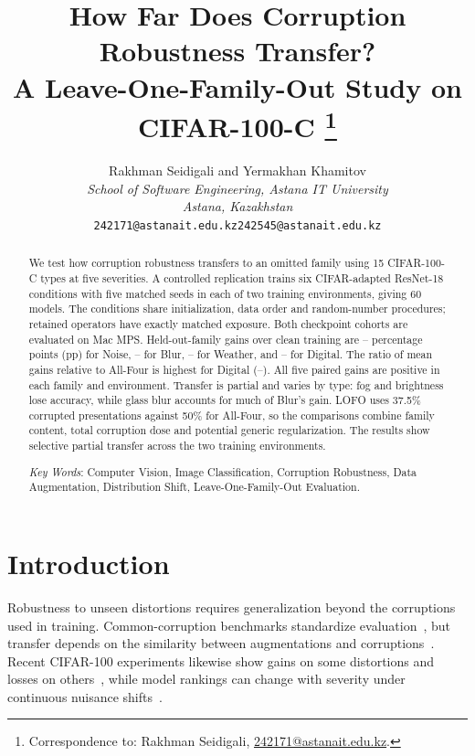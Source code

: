 \documentclass[twoside,a4paper,11pt]{article}
\title{How Far Does Corruption Robustness Transfer?\\
A Leave-One-Family-Out Study on CIFAR-100-C\ifblindreview\else
\footnote[0]{Correspondence to: Rakhman Seidigali, \href{mailto:242171@astanait.edu.kz}{242171@astanait.edu.kz}.}\fi}
\author{Rakhman Seidigali and Yermakhan Khamitov\\[1ex]
\small\emph{School of Software Engineering, Astana IT University}\\
\small\emph{Astana, Kazakhstan}\\
\small\texttt{242171@astanait.edu.kz}\quad\texttt{242545@astanait.edu.kz}}
\date{}
\newif\ifblindreview
\begin{document}
\ifblindreview\maketitleblind\else\maketitle\fi
\pagestyle{plain}
\raggedbottom
\noindent\hrulefill
\begin{abstract}
We test how corruption robustness transfers to an omitted family using 15 CIFAR-100-C types at five severities. A controlled replication trains six CIFAR-adapted ResNet-18 conditions with five matched seeds in each of two training environments, giving 60 models. The conditions share initialization, data order and random-number procedures; retained operators have exactly matched exposure. Both checkpoint cohorts are evaluated on Mac MPS. Held-out-family gains over clean training are \GainNoiseWin{}--\GainNoiseMac{} percentage points (pp) for Noise, \GainBlurWin{}--\GainBlurMac{} for Blur, \GainWeatherWin{}--\GainWeatherMac{} for Weather, and \GainDigitalMac{}--\GainDigitalWin{} for Digital. The ratio of mean gains relative to All-Four is highest for Digital (\RatioDigitalWin{}--\RatioDigitalMac{}). All five paired gains are positive in each family and environment. Transfer is partial and varies by type: fog and brightness lose accuracy, while glass blur accounts for much of Blur's gain. LOFO uses 37.5\% corrupted presentations against 50\% for All-Four, so the comparisons combine family content, total corruption dose and potential generic regularization. The results show selective partial transfer across the two training environments.

\vspace{0.5cm}
\noindent\emph{Key Words}: Computer Vision, Image Classification, Corruption Robustness, Data Augmentation, Distribution Shift, Leave-One-Family-Out Evaluation.
\end{abstract}
\noindent\hrulefill
\section{Introduction}
Robustness to unseen distortions requires generalization beyond the corruptions used in training. Common-corruption benchmarks standardize evaluation~\cite{hendrycks2019corruptions}, but transfer depends on the similarity between augmentations and corruptions~\cite{geirhos2018generalisation,mintun2021interaction}. Recent CIFAR-100 experiments likewise show gains on some distortions and losses on others~\cite{trinh2024damp}, while model rankings can change with severity under continuous nuisance shifts~\cite{dunkel2025cns}.
\end{document}
